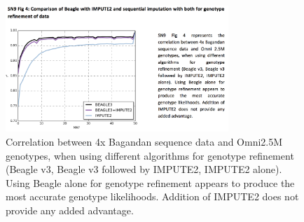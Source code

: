 \begin{figure}[htbp]
\centering
\includegraphics[trim={0 0cm 1cm 0},clip,width=0.75\textwidth]{fig/SN09f4}
\caption{Correlation between 4x Bagandan sequence data and Omni2.5M genotypes, when using different algorithms for genotype refinement (Beagle v3, Beagle v3 followed by IMPUTE2, IMPUTE2 alone). Using Beagle alone for genotype refinement appears to produce the most accurate genotype likelihoods. Addition of IMPUTE2 does not provide any added advantage.}
\label{fig:SN09f4}
\end{figure}